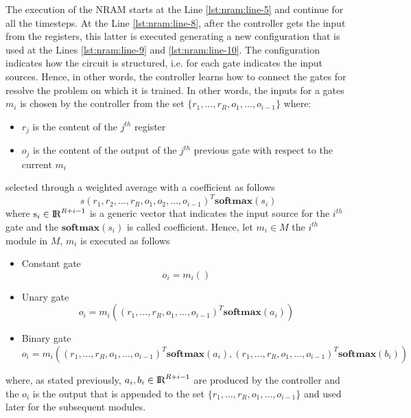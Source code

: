 The execution of the NRAM starts at the Line \ref{lst:nram:line-5} and continue for all the timesteps. At the Line \ref{lst:nram:line-8}, after the controller gets the input from the registers, this latter is executed generating a new configuration that is used at the Lines \ref{lst:nram:line-9} and \ref{lst:nram:line-10}. The configuration indicates how the circuit is structured, i.e. for each gate indicates the input sources. Hence, in other words, the controller learns how to connect the gates for resolve the problem on which it is trained. In other words, the inputs for a gates $m_i$ is chosen by the controller from the set $\{r_{1}, \dots, r_{R}, o_{1}, \dots, o_{i-1}\}$ where:
\begin{itemize}
	\item $r_j$ is the content of the $j^{th}$ register
	\item $o_j$ is the content of the output of the $j^{th}$ previous gate with respect to the current $m_i$
\end{itemize}
selected through a weighted average with a coefficient as follows
\begin{equation}
s	(r_1, r_2, \dots, r_R, o_1, o_2, \dots, o_{i-1})^T\textbf{softmax}(s_i)
\end{equation}
where $\textrm{s}_i \in \textrm{I\!R}^{R+i-1}$ is a generic vector that indicates the input source for the $i^{th}$ gate and the $\textbf{softmax}(s_i)$ is called coefficient. \newline
Hence, let $m_i \in M$ the $i^{th}$ module in $M$, $m_i$ is executed as follows
\begin{itemize}
	\item{Constant gate
		\begin{equation}
			o_i = m_i()
		\end{equation}
	}
	\item{Unary gate
		\begin{equation}
			o_i = m_i((r_1, \dots, r_R, o_1, \dots, o_{i-1})^T\textbf{softmax}(a_i))
		\end{equation}
	}
	\item{Binary gate
		\begin{equation}
			o_i = m_i((r_1, \dots, r_R, o_1, \dots, o_{i-1})^T\textbf{softmax}(a_i), (r_1, \dots, r_R, o_1, \dots, o_{i-1})^T\textbf{softmax}(b_i))
		\end{equation}
	}
\end{itemize}
where, as stated previously, $a_i, b_i \in \textrm{I\!R}^{R+i-1}$ are produced by the controller and the $o_i$ is the output that is appended to the set $\{r_{1}, \dots, r_{R}, o_{1}, \dots, o_{i-1}\}$ and used later for the subsequent modules.
